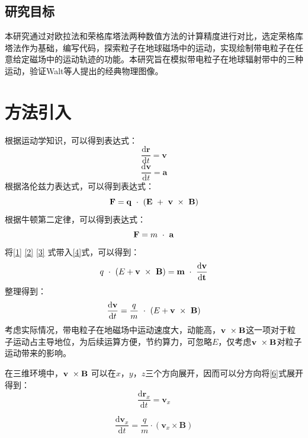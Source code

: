 \documentclass[11pt]{article}
\begin{document}
    \subsection{研究目标}
    本研究通过对欧拉法和荣格库塔法两种数值方法的计算精度进行对比，选定荣格库塔法作为基础，编写代码，探索粒子在地球磁场中的运动，实现绘制带电粒子在任意给定磁场中的运动轨迹的功能。本研究旨在模拟带电粒子在地球辐射带中的三种运动，验证Walt等人提出的经典物理图像。
    

\section{方法引入}

根据运动学知识，可以得到表达式：
\begin{equation}
    \frac{\mathrm{d}\mathbf{r}}{\mathrm{d}t}=\mathbf{v}\label{2}
\end{equation}
\begin{equation}
    \frac{\mathrm{d}\mathbf{v}}{\mathrm{d}t}=\mathbf{a}\label{3}
\end{equation}
根据洛伦兹力表达式，可以得到表达式：
\begin{equation*}
        \bf{F}=q\ \cdot\ (E\ + \ \bf{v}\ \times \ \bf{B})
    \end{equation*}
根据牛顿第二定律，可以得到表达式：
\begin{equation}
    \mathbf{F}=m\ \cdot\ \bf{a}\label{4}
\end{equation}
将\cref{1} \cref{2} \cref{3} 式带入\cref{4}式，可以得到：
\begin{equation}
    q\ \cdot \ (E+\bf{v}\ \times \ \bf{B})=m\ \cdot\ \frac{\mathrm{d}\bf{v}}{\mathrm{d}t}\label{5}
\end{equation}
整理得到：
\begin{equation}
    \frac{\mathrm{d}\bf{v}}{\mathrm{d}t}=\frac{q}{m}\ \cdot \ (E+\bf{v}\ \times \ \bf{B}) \label{6}
\end{equation}
考虑实际情况，带电粒子在地磁场中运动速度大，动能高，$\bf{v}\ \times \bf{B}$这一项对于粒子运动占主导地位，为后续运算方便，节约算力，可忽略$E$，仅考虑$\bf{v}\ \times \bf{B}$对粒子运动带来的影响。



在三维环境中，$\bf{v}\ \times \bf{B}$ 可以在$x，y，z$三个方向展开，因而可以分方向将\cref{6}式展开得到：
\[
\frac{\mathrm{d}\mathbf{r}_x}{\mathrm{d}t} = \mathbf{v}_x
\]

\[
\frac{\mathrm{d}\mathbf{v}_x}{\mathrm{d}t} = \frac{q}{m} \cdot (\mathbf{v}_x \times \mathbf{B})
\]
\end{document}
